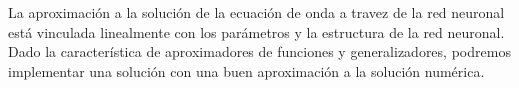 


La aproximación a la solución de la ecuación de onda a travez de la red neuronal está vinculada linealmente con los parámetros y la estructura de la red neuronal. Dado la característica de aproximadores de funciones y generalizadores, podremos implementar una solución con una buen aproximación a la solución numérica.



